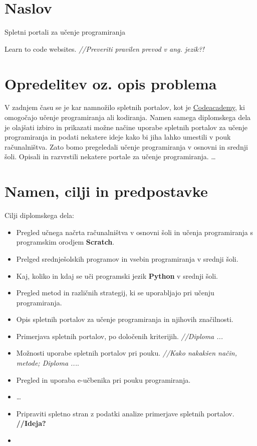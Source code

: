 \section{Naslov}
\label{sec:nalov}

Spletni portali za učenje programiranja

Learn to code websites. \emph{//Preveriti pravilen  prevod v ang. jezik?!}

\section{Opredelitev oz. opis problema}
\label{sec:opredelitev}

V zadnjem času se je kar namnožilo spletnih portalov, kot je
\href{http://www.codecademy.com/}{Codeacademy}, ki omogočajo učenje
programiranja ali kodiranja. Namen samega diplomskega dela je olajšati
izbiro in prikazati možne načine uporabe spletnih portalov za učenje
programiranja in podati nekatere ideje kako bi jiha lahko umestili v
pouk računalništva. Zato bomo pregeledali učenje programiranja v
osnovni in srednji šoli. Opisali in razvrstili nekatere portale za
učenje programiranja. \dots

\section{Namen, cilji in predpostavke}
\label{sec:name_cilji_predpostavke}

Cilji diplomskega dela:

\begin{itemize}
\item Pregled učnega načrta računalništva v osnovni šoli in učenja
  programiranja s programskim orodjem \textbf{Scratch}.
\item Prelged srednješolskih programov in vsebin programiranja v
  srednji šoli.
\item Kaj, koliko in kdaj se uči programski jezik \textbf{Python} v
  srednji šoli.
\item Pregled metod in različnih strategij, ki se uporabljajo pri
  učenju programiranja.
\item Opis spletnih portalov za učenje programiranja in njihovih
  značilnosti.
\item Primerjava spletnih portalov, po določenih
  kriterijih. \emph{//Diploma ...}
\item Možnosti uporabe spletnih portalov pri pouku. \emph{//Kako
    nakakšen način, metode; Diploma ...}.
\item Pregled in uporaba e-učbenika pri pouku programiranja.
\item \dots
\item Pripraviti spletno stran z podatki analize primerjave spletnih
  portalov. \textbf{//Ideja?}
\item
\end{itemize}

